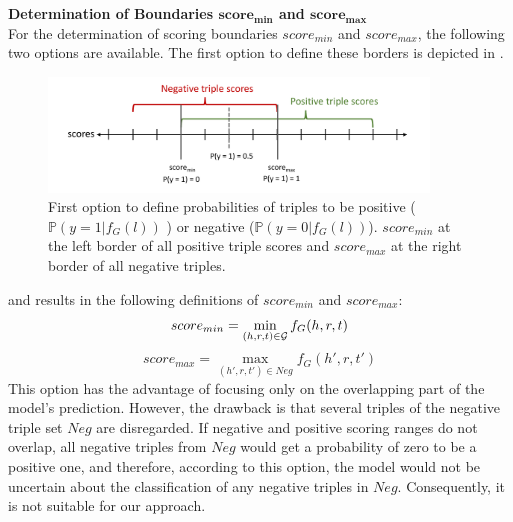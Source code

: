 \textbf{Determination of Boundaries $\textbf{score}_{\textbf{min}}$ and $\textbf{score}_{\textbf{max}}$}\\
For the determination of scoring boundaries $score_{min}$ and $score_{max}$, the following two options are available.
The first option to define these borders is depicted in .
\begin{figure}[H]
  \centering
    \includegraphics[width=0.9\textwidth]{figures/positives_negatives1.pdf}
  \caption{First option to define probabilities of triples to be positive ($\mathds{P}(y = 1 | f_G(l))$ ) or negative ($\mathds{P}(y = 0 | f_G(l))$). 
  $score_{min}$ at the left border of all positive triple scores and $score_{max}$ at the right border of all negative triples.}
  \label{fig:positives_negatives1}
\end{figure}
and results in the following definitions of  $score_{min}$ and 
$score_{max}$:
\begin{equation} \label{eqn:opt2_score_min}
    score_{min} = \min_{(h,r,t) \in \mathcal{G}}{f_G(h,r,t)}
\end{equation}
\begin{equation} \label{eqn:opt2_score_max}
    score_{max} = \max_{(h',r,t') \in Neg}{f_G(h',r,t')}
\end{equation}
This option has the advantage of focusing only on the overlapping part of the model's prediction.
However, the drawback is that several triples of the negative triple set $Neg$ are disregarded.
If negative and positive scoring ranges do not overlap, all negative triples from $Neg$ would get a probability of zero to be a positive one, and therefore, according to this option, the model would not be uncertain about the classification of any negative triples in $Neg$.
Consequently, it is not suitable for our approach.


